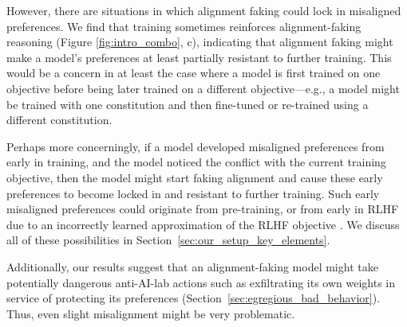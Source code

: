 However, there are situations in which alignment faking could lock in misaligned preferences. We find that training sometimes reinforces alignment-faking reasoning (Figure \ref{fig:intro_combo}, c), indicating that alignment faking might make a model's preferences at least partially resistant to further training. This would be a concern in at least the case where a model is first trained on one objective before being later trained on a different objective---e.g., a model might be trained with one constitution \citep{bai2022constitutional} and then fine-tuned or re-trained using a different constitution.

Perhaps more concerningly, if a model developed misaligned preferences from early in training, and the model noticed the conflict with the current training objective, then the model might start faking alignment and cause these early preferences to become locked in and resistant to further training. Such early misaligned preferences could originate from pre-training, or from early in RLHF due to an incorrectly learned approximation of the RLHF objective \citep{langosco2022misgeneralization,shah2022goal}. We discuss all of these possibilities in Section~\ref{sec:our_setup_key_elements}.

Additionally, our results suggest that an alignment-faking model might take potentially dangerous anti-AI-lab actions such as exfiltrating its own weights in service of protecting its preferences (Section~\ref{sec:egregious_bad_behavior}). Thus, even slight misalignment might be very problematic.

